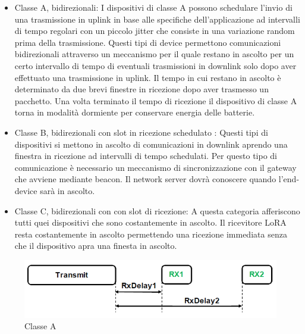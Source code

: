\documentclass[12pt,a4paper,openright,twoside]{report}
\begin{document}
\begin{itemize} 
\item  Classe A, bidirezionali: I dispositivi di classe A possono schedulare l'invio di una trasmissione in uplink in base alle specifiche dell'applicazione ad intervalli di tempo regolari con un piccolo jitter che consiste in una variazione random prima della trasmissione. Questi tipi di device permettono comunicazioni bidirezionali attraverso un meccanismo per il quale restano in ascolto per un certo intervallo di tempo di eventuali trasmissioni in downlink solo dopo aver effettuato una trasmissione in uplink. Il tempo in cui restano in ascolto \`e determinato da due brevi finestre in ricezione dopo aver trasmesso un pacchetto. Una volta terminato il tempo di ricezione il dispositivo di classe A torna in modalit\`a dormiente per conservare energia delle batterie.



\item Classe B, bidirezionali con slot in ricezione schedulato : Questi tipi di dispositivi si mettono in ascolto di comunicazioni in downlink aprendo una finestra in ricezione ad intervalli di tempo schedulati. Per questo tipo di comunicazione \`e necessario un meccanismo di sincronizzazione con il gateway che avviene mediante beacon. Il network server dovr\`a conoscere quando l'end-device sar\`a in ascolto. 

\item Classe C, bidirezionali con con slot di ricezione: A questa categoria afferiscono tutti quei dispositivi che sono costantemente in ascolto. Il ricevitore LoRA resta costantemente in ascolto permettendo una ricezione immediata senza che il dispositivo apra una finesta in ascolto. 
\end{itemize}

\begin{figure}[h]                      
\begin{center} 
\includegraphics[width=\textwidth]{CLASSE-A_receive-window.png} 
\caption[LoRa device classe A]{Classe A}\label{fig:venti}
\end{center}
\end{figure}
\end{document}
